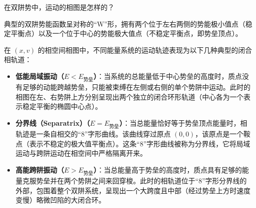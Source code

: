 \begin{exercise}\label{ex:2.13}
在双阱势中，运动的相图是怎样的？
\end{exercise}
\begin{solution}
典型的双阱势能函数呈对称的“W”形，拥有两个位于左右两侧的势能极小值点（稳定平衡点）以及一个位于中心的势能极大值点（不稳定平衡点，即势垒顶点）。

在 $(x, v)$ 的相空间相图中，不同能量系统的运动轨迹表现为以下几种典型的闭合相轨道：
\begin{itemize}
    \item \textbf{低能局域振动（$E < E_{\text{势垒}}$）}：当系统的总能量低于中心势垒的高度时，质点没有足够的动能跨越势垒，只能被束缚在左侧或右侧的单个势阱中运动。此时的相图在左、右势阱上方分别呈现出两个独立的闭合环形轨道（中心各为一个表示稳定平衡的椭圆中心点）。
    \item \textbf{分界线（Separatrix）（$E = E_{\text{势垒}}$）}：当总能量恰好等于势垒顶点能量时，相轨迹是一条自相交的“8”字形曲线。该曲线穿过原点 $(0,0)$，该原点是一个鞍点（表示不稳定的极大值平衡点）。这条“8”字形曲线被称为分界线，它将局域运动与跨阱运动在相空间中严格隔离开来。
    \item \textbf{高能跨阱振动（$E > E_{\text{势垒}}$）}：当总能量高于势垒的高度时，质点具有足够的能量克服势垒并在两个势阱之间来回穿梭。此时的相轨道位于“8”字形分界线的外部，包围着整个双阱系统，呈现出一个大跨度且中部（经过势垒上方时速度变慢）略微凹陷的大闭合环。
\end{itemize}
\end{solution}

